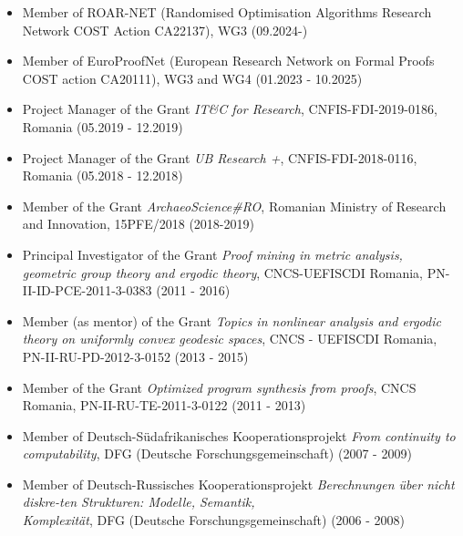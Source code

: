 \documentclass[12pt]{article}
\begin{document}
\begin{itemize}
\item Member of ROAR-NET (Randomised Optimisation Algorithms Research Network COST Action CA22137), WG3 (09.2024-)
\item Member of EuroProofNet (European Research Network on Formal Proofs
COST action CA20111), WG3 and WG4 (01.2023 - 10.2025)
\item Project Manager of the Grant {\em IT\&C for Research}, CNFIS-FDI-2019-0186, Romania (05.2019 - 12.2019)
\item Project Manager of the Grant {\em UB Research +}, CNFIS-FDI-2018-0116, Romania (05.2018 - 12.2018)
\item Member of the Grant {\em ArchaeoScience\#RO}, 
Romanian Ministry of Research and Innovation, 15PFE/2018 (2018-2019)
\item Principal Investigator of the Grant
{\em Proof mining in metric analysis, geometric group theory and ergodic theory}, 
CNCS-UEFISCDI Romania, PN-II-ID-PCE-2011-3-0383 (2011 - 2016)
\item Member (as mentor) of the Grant {\em Topics in nonlinear analysis and ergodic theory on uniformly convex geodesic spaces},
CNCS - UEFISCDI Romania, PN-II-RU-PD-2012-3-0152 (2013 - 2015)
\item Member of the Grant
{\em Optimized program synthesis from proofs}, 
CNCS Romania, PN-II-RU-TE-2011-3-0122 (2011 - 2013)
\item Member of Deutsch-S\" udafrikanisches Kooperationsprojekt
 {\em From continuity to computability}, 
DFG (Deutsche Forschungsgemeinschaft) (2007 - 2009)
\item Member of Deutsch-Russisches Kooperationsprojekt 
{\em Berechnungen \" uber nicht diskre-ten Strukturen: Modelle, Semantik, \\Komplexit\"{a}t}, 
DFG (Deutsche Forschungsgemeinschaft) (2006 - 2008)
\end{itemize}
\end{document}
